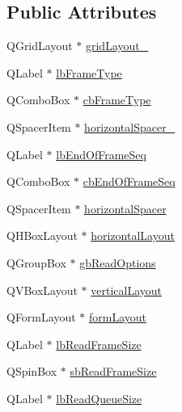 \subsection*{Public Attributes}
\begin{DoxyCompactItemize}
\item 
Q\-Grid\-Layout $\ast$ \hyperlink{class_ui__mdt_port_config_widget_a8884949275b265ab5237387853caa3f2}{grid\-Layout\-\_}
\item 
Q\-Label $\ast$ \hyperlink{class_ui__mdt_port_config_widget_aeae3047fddb41727e04fc3e6bfdc927a}{lb\-Frame\-Type}
\item 
Q\-Combo\-Box $\ast$ \hyperlink{class_ui__mdt_port_config_widget_a6617d0644b077d3c2121ffac409f37ea}{cb\-Frame\-Type}
\item 
Q\-Spacer\-Item $\ast$ \hyperlink{class_ui__mdt_port_config_widget_ae5f3f9e6cec6a29a322810cb540142b1}{horizontal\-Spacer\-\_}
\item 
Q\-Label $\ast$ \hyperlink{class_ui__mdt_port_config_widget_ad5562fe2796e0be78a753112e6635f22}{lb\-End\-Of\-Frame\-Seq}
\item 
Q\-Combo\-Box $\ast$ \hyperlink{class_ui__mdt_port_config_widget_a420d2e797a1a6dbf7e8756d85855c40d}{cb\-End\-Of\-Frame\-Seq}
\item 
Q\-Spacer\-Item $\ast$ \hyperlink{class_ui__mdt_port_config_widget_a97589c828c3f0820865493e946f59a07}{horizontal\-Spacer}
\item 
Q\-H\-Box\-Layout $\ast$ \hyperlink{class_ui__mdt_port_config_widget_a460469cd300019bbca6f85af5f13796a}{horizontal\-Layout}
\item 
Q\-Group\-Box $\ast$ \hyperlink{class_ui__mdt_port_config_widget_a14fd5ecbe4eb1666678e44a646a06fd3}{gb\-Read\-Options}
\item 
Q\-V\-Box\-Layout $\ast$ \hyperlink{class_ui__mdt_port_config_widget_aea81d581baa2c160bf8ff37ec74a63fc}{vertical\-Layout}
\item 
Q\-Form\-Layout $\ast$ \hyperlink{class_ui__mdt_port_config_widget_a1679d7bc8690fb1f4bcf59c92f53b572}{form\-Layout}
\item 
Q\-Label $\ast$ \hyperlink{class_ui__mdt_port_config_widget_a73d82c7cfbd664ac2d81866000cb4f8d}{lb\-Read\-Frame\-Size}
\item 
Q\-Spin\-Box $\ast$ \hyperlink{class_ui__mdt_port_config_widget_a4488f322a2a11187cee4f229dbb78aac}{sb\-Read\-Frame\-Size}
\item 
Q\-Label $\ast$ \hyperlink{class_ui__mdt_port_config_widget_a78d9233108a570f4572c1b3fd9d22158}{lb\-Read\-Queue\-Size}

\end{DoxyCompactItemize}
